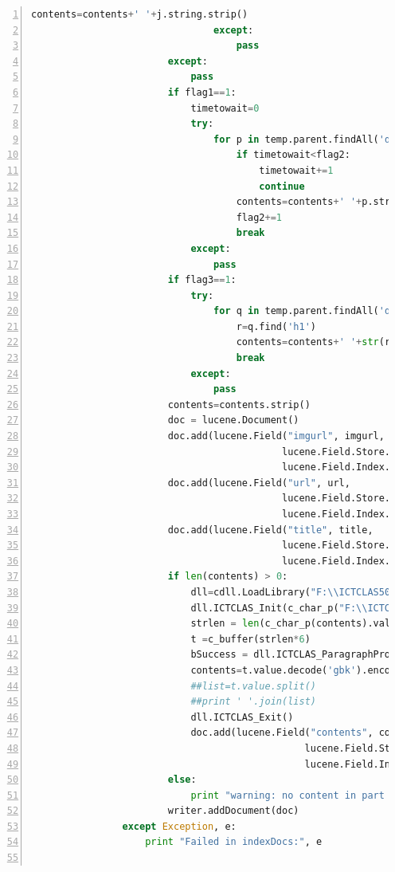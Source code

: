 \documentclass{article}
\begin{document}
\begin{lstlisting}[language=python,numbers=left,frame=leftline]
                                    contents=contents+' '+j.string.strip()
                                except:
                                    pass
                        except:
                            pass
                        if flag1==1:
                            timetowait=0
                            try:
                                for p in temp.parent.findAll('div',{'class':'card-content'}):
                                    if timetowait<flag2:
                                        timetowait+=1
                                        continue
                                    contents=contents+' '+p.string.strip()
                                    flag2+=1
                                    break
                            except:
                                pass
                        if flag3==1:
                            try:
                                for q in temp.parent.findAll('div',{'class':'post-title'}):
                                    r=q.find('h1')
                                    contents=contents+' '+str(r.string).decode('utf8')
                                    break
                            except:
                                pass
                        contents=contents.strip()
                        doc = lucene.Document()
                        doc.add(lucene.Field("imgurl", imgurl,
                                            lucene.Field.Store.YES,
                                            lucene.Field.Index.NOT_ANALYZED))
                        doc.add(lucene.Field("url", url,
                                            lucene.Field.Store.YES,
                                            lucene.Field.Index.NOT_ANALYZED))
                        doc.add(lucene.Field("title", title,
                                            lucene.Field.Store.YES,
                                            lucene.Field.Index.NOT_ANALYZED))
                        if len(contents) > 0:
                            dll=cdll.LoadLibrary("F:\\ICTCLAS50_Windows_32_C\ICTCLAS50.dll")
                            dll.ICTCLAS_Init(c_char_p("F:\\ICTCLAS50_Windows_32_C"))
                            strlen = len(c_char_p(contents).value)
                            t =c_buffer(strlen*6)
                            bSuccess = dll.ICTCLAS_ParagraphProcess(c_char_p(contents),c_int(strlen),t,c_int(0),0)
                            contents=t.value.decode('gbk').encode('utf8')
                            ##list=t.value.split()
                            ##print ' '.join(list)
                            dll.ICTCLAS_Exit()
                            doc.add(lucene.Field("contents", contents,
                                                lucene.Field.Store.NO,
                                                lucene.Field.Index.ANALYZED))
                        else:
                            print "warning: no content in part of %s" % filename
                        writer.addDocument(doc)
                except Exception, e:
                    print "Failed in indexDocs:", e


\end{lstlisting}
\end{document}
